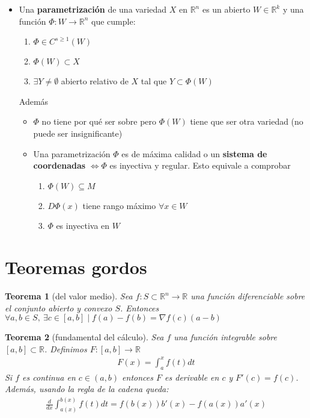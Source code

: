 \documentclass[a4paper,twocolumn]{extarticle}
\newcommand{\R}{\mathbb{R}}
\newtheorem*{thm}{Teorema}
\begin{document}
\begin{itemize}
\begin{itemize}
	\end{itemize}
	\item Una \textbf{parametrización} de una variedad $X$ en $\R^n$ es un abierto $W \in \R^k$ y una función $\Phi:W \to \R^n$ que cumple:
	\begin{enumerate}
		\item $\Phi \in C^{s \geq 1}(W)$
		\item $\Phi(W) \subset X$
		\item $\exists Y \neq \emptyset$ abierto relativo de $X$ tal que $Y \subset \Phi(W)$ 
	\end{enumerate}
	Además
	\begin{itemize}
		\item $\Phi$ no tiene por qué ser sobre pero $\Phi(W)$ tiene que ser otra variedad (no puede ser insignificante)
		\item Una parametrización $\Phi$ es de máxima calidad o un \textbf{sistema de coordenadas} $\iff \Phi$ es inyectiva y regular. Esto equivale a comprobar
		\begin{enumerate}
			\item $\Phi(W) \subseteq M$
			\item $D\Phi(x)$ tiene rango máximo $\forall x \in W$
			\item $\Phi$ es inyectiva en $W$
		\end{enumerate}
	\end{itemize}
\end{itemize}

\section{Teoremas gordos}

\begin{thm}[del valor medio]
	Sea $f: S \subset \R^n \to \R$ una función diferenciable sobre el conjunto abierto y convexo $S$. Entonces $\forall a, b \in S,\ \exists c \in [a,b] \mid f(a) - f(b) = \nabla f(c)(a - b)$
\end{thm}

\begin{thm}[fundamental del cálculo]
	Sea $f$ una función integrable sobre $[a,b] \subset \R$. Definimos $F:[a,b] \to \R$
	\begin{align*}
		F(x) = \int_{a}^{x} f(t)dt
	\end{align*}
	Si $f$ es continua en $c \in (a,b)$ entonces $F$ es derivable en $c$ y $F'(c) = f(c)$. Además, usando la regla de la cadena queda:
	\begin{align*}
		\frac{d}{dx}\int_{a(x)}^{b(x)} f(t)dt = f(b(x))b'(x) - f(a(x))a'(x)
	\end{align*}
\end{thm}
\end{document}
